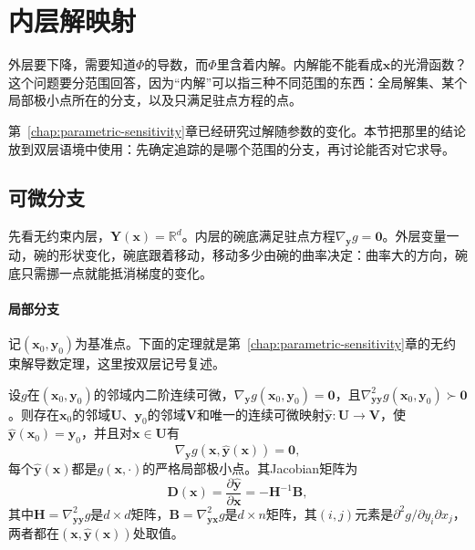 \section{内层解映射}
\label{sec:bilevel-solution-map}

外层要下降，需要知道$\Phi$的导数，而$\Phi$里含着内解。内解能不能看成$\bm{x}$的光滑函数？这个问题要分范围回答，因为“内解”可以指三种不同范围的东西：全局解集、某个局部极小点所在的分支，以及只满足驻点方程的点。

第~\ref{chap:parametric-sensitivity}章已经研究过解随参数的变化。本节把那里的结论放到双层语境中使用：先确定追踪的是哪个范围的分支，再讨论能否对它求导。

\subsection{可微分支}
\label{sec:bilevel-branch}

先看无约束内层，$\bm{Y}(\bm{x})=\mathbb{R}^d$。内层的碗底满足驻点方程$\nabla_{\bm{y}}g=\bm{0}$。外层变量一动，碗的形状变化，碗底跟着移动，移动多少由碗的曲率决定：曲率大的方向，碗底只需挪一点就能抵消梯度的变化。

\paragraph{局部分支}
记$(\bm{x}_0,\bm{y}_0)$为基准点。下面的定理就是第~\ref{chap:parametric-sensitivity}章的无约束解导数定理，这里按双层记号复述。

\begin{theorem}[局部极小分支]
\label{thm:bilevel-local-branch}
设$g$在$(\bm{x}_0,\bm{y}_0)$的邻域内二阶连续可微，$\nabla_{\bm{y}}g(\bm{x}_0,\bm{y}_0)=\bm{0}$，且$\nabla^2_{\bm{y}\bm{y}}g(\bm{x}_0,\bm{y}_0)\succ\bm{0}$。则存在$\bm{x}_0$的邻域$\bm{U}$、$\bm{y}_0$的邻域$\bm{V}$和唯一的连续可微映射$\hat{\bm{y}}:\bm{U}\to\bm{V}$，使$\hat{\bm{y}}(\bm{x}_0)=\bm{y}_0$，并且对$\bm{x}\in\bm{U}$有
\begin{equation}
 \nabla_{\bm{y}}g(\bm{x},\hat{\bm{y}}(\bm{x}))=\bm{0},
 \label{eq:bilevel-branch-stationary}
\end{equation}
每个$\hat{\bm{y}}(\bm{x})$都是$g(\bm{x},\cdot)$的严格局部极小点。其Jacobian矩阵为
\begin{equation}
 \bm{D}(\bm{x})=\frac{\partial\hat{\bm{y}}}{\partial\bm{x}}=-\bm{H}^{-1}\bm{B},
 \label{eq:bilevel-branch-derivative}
\end{equation}
其中$\bm{H}=\nabla^2_{\bm{y}\bm{y}}g$是$d\times d$矩阵，$\bm{B}=\nabla^2_{\bm{y}\bm{x}}g$是$d\times n$矩阵，其$(i,j)$元素是$\partial^2g/\partial y_i\partial x_j$，两者都在$(\bm{x},\hat{\bm{y}}(\bm{x}))$处取值。
\end{theorem}

